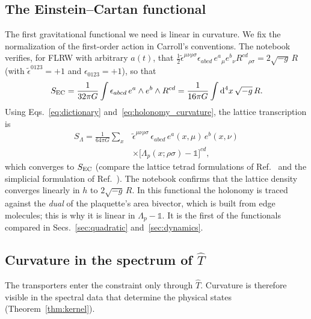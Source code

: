 \documentclass[reprint,aps,prd,amsmath,amssymb,superscriptaddress,nofootinbib,floatfix]{revtex4-2}
\theoremstyle{plain}
\theoremstyle{definition}
\theoremstyle{remark}
\newcommand{\dd}{\mathrm{d}}
\newcommand{\Tc}{\hat{T}}
\newcommand{\one}{\mathbb{1}}
\begin{document}
\subsection{The Einstein--Cartan functional}
\label{sec:ec}

The first gravitational functional we need is linear in curvature. We fix the normalization of the
first-order action in Carroll's conventions.
The notebook verifies, for FLRW with arbitrary $a(t)$, that
$\tfrac12\tilde\epsilon^{\mu\nu\rho\sigma}\epsilon_{abcd}\,e^a{}_\mu e^b{}_\nu R^{cd}{}_{\rho\sigma}=2\sqrt{-g}\,R$ (with
$\tilde\epsilon^{0123}=+1$ and $\epsilon_{0123}=+1$), so that
\begin{equation}
S_{\rm EC}=\frac{1}{32\pi G}\int\epsilon_{abcd}\,e^a\wedge e^b\wedge R^{cd}
=\frac{1}{16\pi G}\int\dd^4x\,\sqrt{-g}\,R .
\label{eq:palatini}
\end{equation}
Using Eqs.~\eqref{eq:dictionary} and~\eqref{eq:holonomy_curvature}, the lattice transcription is
\begin{equation}
\begin{aligned}
S_\Lambda=\frac{1}{64\pi G}\sum_x{}&\tilde\epsilon^{\mu\nu\rho\sigma}\,\epsilon_{abcd}\,
e^a(x,\mu)\,e^b(x,\nu)\\
&\times\big[\Lambda_p(x;\rho\sigma)-\one\big]^{cd},
\end{aligned}
\label{eq:lattice_action}
\end{equation}
which converges to $S_{\rm EC}$ (compare the lattice tetrad formulations of Ref.~\cite{Smolin1979} and the
simplicial formulation of Ref.~\cite{Regge1961}). The notebook confirms that the lattice density converges
linearly in $h$ to $2\sqrt{-g}\,R$. In this functional the holonomy is traced against the
\emph{dual} of the plaquette's area bivector, which is built from edge molecules; this is why it is linear in
$\Lambda_p-\one$. It is the first of the functionals compared in Secs.~\ref{sec:quadratic}
and~\ref{sec:dynamics}.

\subsection{Curvature in the spectrum of $\Tc$}
\label{sec:spectral}

The transporters enter the constraint only through $\Tc$. Curvature is therefore visible in the spectral
data that determine the physical states (Theorem~\ref{thm:kernel}).
\end{document}

